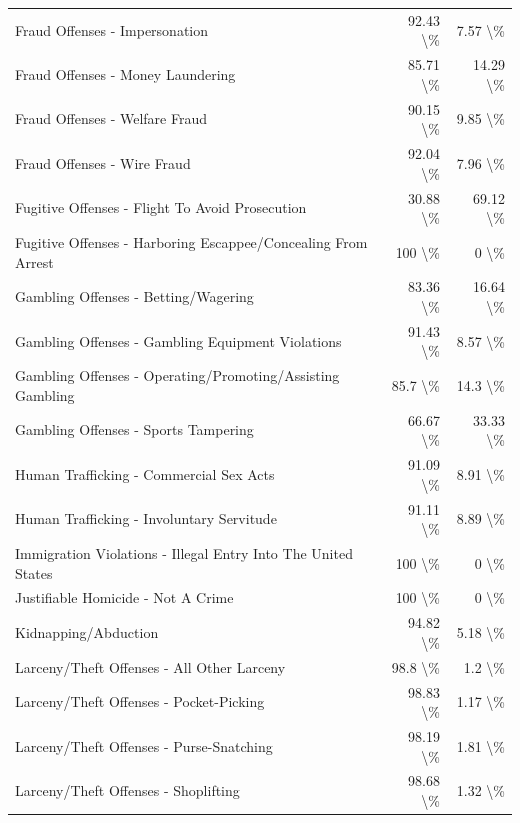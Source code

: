 \documentclass[
  12pt,
  openany]{book}
\begin{document}
\begin{longtable}[t]{lrr}
Fraud Offenses - Impersonation & 92.43 \textbackslash{}\% & 7.57 \textbackslash{}\%\\
Fraud Offenses - Money Laundering & 85.71 \textbackslash{}\% & 14.29 \textbackslash{}\%\\
\addlinespace
Fraud Offenses - Welfare Fraud & 90.15 \textbackslash{}\% & 9.85 \textbackslash{}\%\\
Fraud Offenses - Wire Fraud & 92.04 \textbackslash{}\% & 7.96 \textbackslash{}\%\\
Fugitive Offenses - Flight To Avoid Prosecution & 30.88 \textbackslash{}\% & 69.12 \textbackslash{}\%\\
Fugitive Offenses - Harboring Escappee/Concealing From Arrest & 100 \textbackslash{}\% & 0 \textbackslash{}\%\\
Gambling Offenses - Betting/Wagering & 83.36 \textbackslash{}\% & 16.64 \textbackslash{}\%\\
\addlinespace
Gambling Offenses - Gambling Equipment Violations & 91.43 \textbackslash{}\% & 8.57 \textbackslash{}\%\\
Gambling Offenses - Operating/Promoting/Assisting Gambling & 85.7 \textbackslash{}\% & 14.3 \textbackslash{}\%\\
Gambling Offenses - Sports Tampering & 66.67 \textbackslash{}\% & 33.33 \textbackslash{}\%\\
Human Trafficking - Commercial Sex Acts & 91.09 \textbackslash{}\% & 8.91 \textbackslash{}\%\\
Human Trafficking - Involuntary Servitude & 91.11 \textbackslash{}\% & 8.89 \textbackslash{}\%\\
\addlinespace
Immigration Violations - Illegal Entry Into The United States & 100 \textbackslash{}\% & 0 \textbackslash{}\%\\
Justifiable Homicide - Not A Crime & 100 \textbackslash{}\% & 0 \textbackslash{}\%\\
Kidnapping/Abduction & 94.82 \textbackslash{}\% & 5.18 \textbackslash{}\%\\
Larceny/Theft Offenses - All Other Larceny & 98.8 \textbackslash{}\% & 1.2 \textbackslash{}\%\\
Larceny/Theft Offenses - Pocket-Picking & 98.83 \textbackslash{}\% & 1.17 \textbackslash{}\%\\
\addlinespace
Larceny/Theft Offenses - Purse-Snatching & 98.19 \textbackslash{}\% & 1.81 \textbackslash{}\%\\
Larceny/Theft Offenses - Shoplifting & 98.68 \textbackslash{}\% & 1.32 \textbackslash{}\%\\

\end{longtable}
\end{document}

